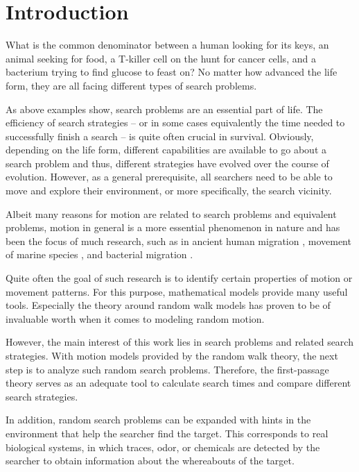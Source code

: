\chapter{Introduction}\label{ch:intro}
What is the common denominator between a human looking for its keys, an animal seeking for food, a T-killer cell on the hunt for cancer cells, and a bacterium trying to find glucose to feast on? No matter how advanced the life form, they are all facing different types of search problems.

As above examples show, search problems are an essential part of life. The efficiency of search strategies -- or in some cases equivalently the time needed to successfully finish a search -- is quite often crucial in survival. Obviously, depending on the life form, different capabilities are available to go about a search problem and thus, different strategies have evolved over the course of evolution. However, as a general prerequisite, all searchers need to be able to move and explore their environment, or more specifically, the search vicinity.

Albeit many reasons for motion are related to search problems and equivalent problems, motion in general is a more essential phenomenon in nature and has been the focus of much research, such as in ancient human migration \cite{flores:2007}, movement of marine species \cite{pittman:2003}, and bacterial migration \cite{harkes:1992}.

Quite often the goal of such research is to identify certain properties of motion or movement patterns. For this purpose, mathematical models provide many useful tools. Especially the theory around random walk models has proven to be of invaluable worth when it comes to modeling random motion.

However, the main interest of this work lies in search problems and related search strategies. With motion models provided by the random walk theory, the next step is to analyze such random search problems. Therefore, the first-passage theory serves as an adequate tool to calculate search times and compare different search strategies.

In addition, random search problems can be expanded with hints in the environment that help the searcher find the target. This corresponds to real biological systems, in which \eg traces, odor, or chemicals are detected by the searcher to obtain information about the whereabouts of the target.

